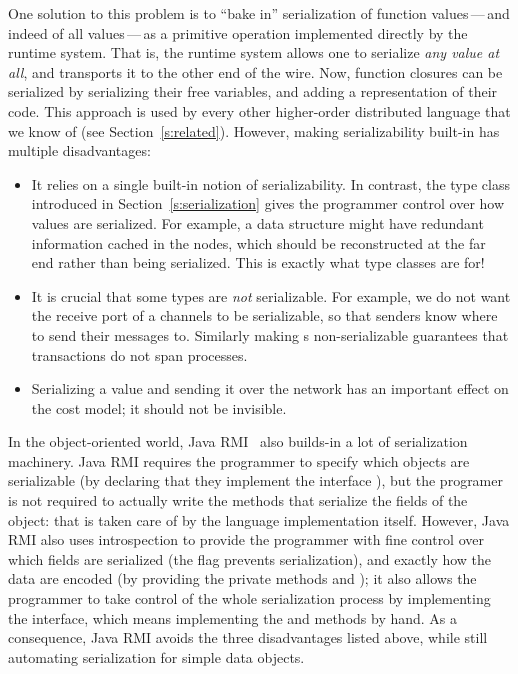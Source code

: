 \documentclass[preprint]{sigplanconf}
\begin{document}
One solution to this problem is to ``bake in'' serialization of
function values\,---\,and indeed of all values\,---\,as a primitive operation
implemented directly by the runtime system.  That is, the runtime system
allows one to serialize \emph{any value at all}, and transports it to the 
other end of the wire.  
Now, function closures can be serialized by
serializing their free variables, and adding a representation of their code.
This approach is used by every other 
higher-order distributed language that we know of (see Section~\ref{s:related}).
However, making serializability built-in
has multiple disadvantages:
\begin{itemize}
\item It relies on a single built-in notion of serializability.
In contrast, the  type class introduced in 
Section~\ref{s:serialization} gives the programmer control over how
values are serialized.  For example, a data structure might have
redundant information cached in the nodes, which should be reconstructed
at the far end rather than being serialized.  
This is exactly what type
classes are for!
\item It is crucial that some types are \emph{not} serializable. For
example, we do not want the receive port of a channels to be serializable, 
so that senders know where to send their messages to.  Similarly making 
s non-serializable guarantees that  transactions 
do not span processes.
\item Serializing a value and sending it over the network has an important
effect on the cost model; it should not be invisible.
\end{itemize}
\noindent
In the object-oriented world, Java RMI~\cite{javarmi} also builds-in a lot of serialization machinery.  
Java RMI requires the programmer to specify which objects are serializable (by declaring that they implement the interface ), but the programer is not required to actually write the methods that serialize the fields of the object: that is taken care of by the language implementation itself.
However, Java RMI also uses introspection to provide the programmer with fine control over
which fields are serialized (the  flag prevents serialization), and exactly how the data are encoded (by providing the private methods  and ); it also allows the programmer to take control of the whole serialization process by implementing the  interface, which means implementing the  and  methods by hand. 
As a consequence, Java RMI avoids the three disadvantages listed above, while still automating serialization for simple data objects.
\end{document}
